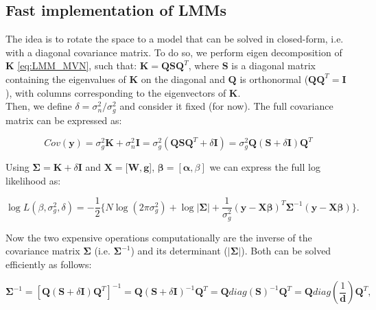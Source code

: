 \subsection{Fast implementation of LMMs}

The idea is to rotate the space to a model that can be solved in closed-form, i.e. with a diagonal covariance matrix. 
To do so, we perform eigen decomposition of $\mathbf{K}$ \eqref{eq:LMM_MVN}, such that: $\mathbf{K} = \mathbf{Q}\mathbf{S}\mathbf{Q}^T$, where $\mathbf{S}$ is a diagonal matrix containing the eigenvalues of $\mathbf{K}$ on the diagonal and $\mathbf{Q}$ is orthonormal ($\mathbf{Q}\mathbf{Q}^T = \mathbf{I}$), with columns corresponding to the eigenvectors of $\mathbf{K}$. \\

Then, we define $\delta = \sigma_n^2/\sigma_g^2$ and consider it fixed (for now).
The full covariance matrix can be expressed as:

\begin{equation}\label{eq:fast_lmm_full_covariance}
 Cov(\mathbf{y}) = \sigma_g^2\mathbf{K} + \sigma_n^2\mathbf{I} = \sigma_g^2(\mathbf{Q}\mathbf{S}\mathbf{Q}^T + \delta\mathbf{I})= \sigma_g^2\mathbf{Q} (\mathbf{S} + \delta\mathbf{I})\mathbf{Q}^T
\end{equation}

Using $\boldsymbol{\Sigma} = \mathbf{K} + \delta\mathbf{I}$ and $\mathbf{X} = [\mathbf{W}, \mathbf{g}$], $\boldsymbol{\beta} = [\boldsymbol{\alpha}, \beta]$ we can express the full log likelihood as:

\begin{equation} \label{eq:fast_lmm_log_likelihood}
 \log{L(\beta, \sigma_g^2, \delta)} = -\frac{1}{2} \bigg\{N\log(2\pi\sigma_g^2) + \log{|\boldsymbol{\Sigma}|}+ \frac{1}{\sigma_g^2}(\mathbf{y}-\mathbf{X}\boldsymbol{\beta})^T\boldsymbol{\Sigma}^{-1}(\mathbf{y}-\mathbf{X}\boldsymbol{\beta}) \bigg\}. 
\end{equation}

Now the two expensive operations computationally are the inverse of the covariance matrix $\boldsymbol{\Sigma}$ (i.e. $\boldsymbol{\Sigma}^{-1}$) and its determinant ($|\boldsymbol{\Sigma}|$). 
Both can be solved efficiently as follows:  

\begin{equation}\label{eq:fast_lmm_Sigma_inverse}
    \boldsymbol{\Sigma}^{-1} = [\mathbf{Q} (\mathbf{S} + \delta\mathbf{I})\mathbf{Q}^T]^{-1} = \mathbf{Q} (\mathbf{S} + \delta\mathbf{I})^{-1}\mathbf{Q}^T = \mathbf{Q} diag(\mathbf{S})^{-1}\mathbf{Q}^T = \mathbf{Q} diag(\frac{1}{\mathbf{d}})\mathbf{Q}^T,
\end{equation}


